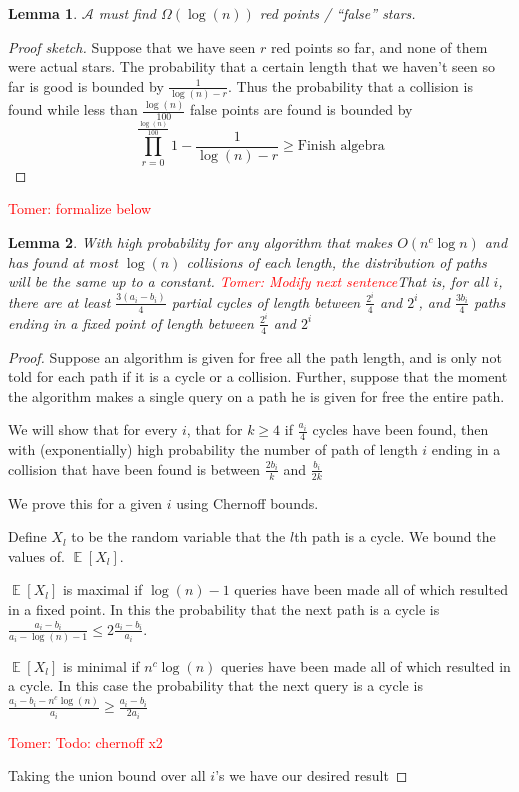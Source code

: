 \documentclass[11pt]{article}
\numberwithin{equation}{section}
\newtheorem{lemma}[lemma]{Lemma}
\newcommand\E{\mathop{\mathbb E}}
\newcommand{\1}{\mathbf{1}}
\newcommand{\A}{\mathcal A}
\newcommand{\beq}{\begin{equation}}
\newcommand{\eeq}{\end{equation}}
\newcommand\tomer[1]{{\textcolor{red}{Tomer: #1}}}
\begin{document}
\begin{lemma}
$\A$ must find $\Omega(\log(n))$ red points / ``false'' stars.
\end{lemma}
\begin{proof}[Proof sketch]
Suppose that we have seen $r$ red points so far, and none of them were actual stars. The probability that a certain length that we haven't seen so far is good is bounded by $\frac{1}{\log(n) - r}$. Thus the probability that a collision is found while less than $\frac{\log(n)}{100}$ false points are found is  bounded by \beq \prod_{r=0}^{\frac{\log(n)}{100}}  1 - \frac{1}{\log(n) - r} \ge \text{Finish algebra}\eeq


\end{proof}

\tomer{formalize below}
\begin{lemma} \label{Lem:distDoesntChange}
With high probability for any algorithm that makes $O(n^c \log n)$ and has found at most $\log(n)$ collisions of each length, the distribution of paths will be the same up to a constant. \tomer{Modify next sentence}That is, for all $i$, there are at least $\frac{3(a_i - b_i)}{4}$ partial cycles of length between $\frac{2^i}{4}$ and $2^i$, and $\frac{3b_i}{4}$ paths ending in a fixed point of length between $\frac{2^i}{4}$ and $2^i$
\end{lemma}

\begin{proof}
Suppose an algorithm is given for free all the path length, and is only not told for each path if it is a cycle or a collision. Further, suppose that the moment the algorithm makes a single query on a path he is given for free the entire path.

We will show that for every $i$, that for  $k \ge 4$ if $\frac{a_i}{4}$ cycles have been found, then with (exponentially) high probability the number of path of length $i$ 
ending in a collision that have been found is between $\frac{2b_i}{k}$ and $\frac{b_i}{2k}$

We prove this for a given $i$ using Chernoff bounds. 

Define $X_l$ to be the random variable that the $l$th path is a cycle. We bound the values of. $\E[X_l]$.

$\E[X_l]$ is maximal if $\log(n)-1$ queries have been made all of which resulted in a fixed point. In this the probability that the next path is a cycle is $\frac{a_i - b_i}{a_i - \log(n) - 1} \le 2\frac{a_i-b_i}{a_i}$.

$\E[X_l]$ is minimal if $n^c \log(n)$ queries have been made all of which resulted in a cycle. In this case the probability that the next query is a cycle is $\frac{a_i - b_i - n^c \log(n)}{a_i} \ge \frac{a_i-b_i}{2a_i} $

\tomer{Todo: chernoff x2}



Taking the union bound over all $i$'s we have our desired result












\end{proof}
\fi
\end{document}
